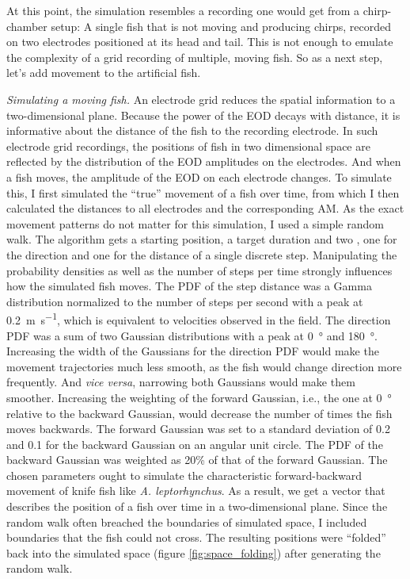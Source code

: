 At this point, the simulation resembles a recording one would get from a
chirp-chamber setup: A single fish that is not moving and producing chirps,
recorded on two electrodes positioned at its head and tail. This is not enough
to emulate the complexity of a grid recording of multiple, moving fish. So as a
next step, let's add movement to the artificial fish.

\emph{Simulating a moving fish.} An electrode grid reduces the spatial
information to a two-dimensional plane. Because the power of the EOD decays
with distance, it is informative about the distance of the fish to the
recording electrode. In such electrode grid recordings, the positions of fish
in two dimensional space are reflected by the distribution of the EOD
amplitudes on the electrodes. And when a fish moves, the amplitude of the EOD
on each electrode changes. To simulate this, I first simulated the
\enquote{true} movement of a fish over time, from which I then calculated the
distances to all electrodes and the corresponding \acrfull{AM}. As the exact
movement patterns do not matter for this simulation, I used a simple random
walk. The algorithm gets a starting position, a target duration and two
, one for the direction and one for the distance of a single
discrete step. Manipulating the probability densities as well as the number of
steps per time strongly influences how the simulated fish moves. The PDF of the
step distance was a Gamma distribution normalized to the number of steps per
second with a peak at \SI{0.2}{\meter\per\second}, which is equivalent to
velocities observed in the field. The direction PDF was a sum of two Gaussian
distributions with a peak at \SI{0}{\degree} and \SI{180}{\degree}. Increasing
the width of the Gaussians for the direction PDF would make the movement
trajectories much less smooth, as the fish would change direction more
frequently. And \emph{vice versa}, narrowing both Gaussians would make them
smoother. Increasing the weighting of the forward Gaussian, i.e., the one at
\SI{0}{\degree} relative to the backward Gaussian, would decrease the number of
times the fish moves backwards. The forward Gaussian was set to a standard
deviation of 0.2 and 0.1 for the backward Gaussian on an angular unit circle.
The PDF of the backward Gaussian was weighted as 20\% of that of the forward
Gaussian. The chosen parameters ought to simulate the characteristic
forward-backward movement of knife fish like \textit{A. leptorhynchus}. As a
result, we get a vector that describes the position of a fish over time in a
two-dimensional plane. Since the random walk often breached the boundaries of
simulated space, I included boundaries that the fish could not cross. The
resulting positions were \enquote{folded} back into the simulated space (figure
\ref{fig:space_folding}) after generating the random walk.

